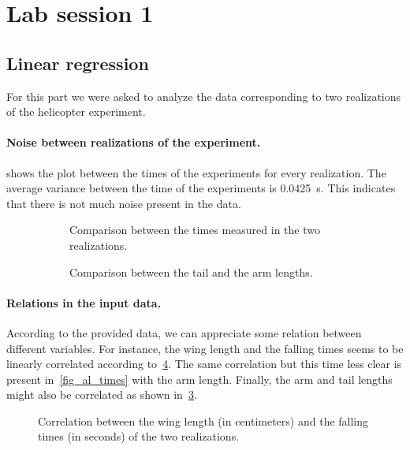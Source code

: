 \section{Lab session 1}

\subsection{Linear regression}
For this part we were asked to analyze the data corresponding to two
realizations of the helicopter experiment.

\paragraph{Noise between realizations of the experiment.}

 shows the plot between the times of the experiments for every
realization. The average variance between the time of the experiments is
\SI{0.0425}{\second}. This indicates that there is not much noise present in the
data.

\begin{figure}
  \begin{subfigure}[h]{.5\linewidth}
    
    \caption{Comparison between the times measured in the two realizations.}
    \label{fig_t1t2}
  \end{subfigure}
  \begin{subfigure}[h]{.5\linewidth}
    
    \caption{Comparison between the tail and the arm lengths.}
    \label{fig_tl_al}
  \end{subfigure}
  \caption{}
\end{figure}

\paragraph{Relations in the input data.}
According to the provided data, we can appreciate some relation between
different variables. For instance, the wing length and the falling times seems
to be linearly correlated according to~\cref{fig_wl_times}. The same correlation
but this time less clear is present in~\cref{fig_al_times} with the arm length.
Finally, the arm and tail lengths might also be correlated as shown
in~\cref{fig_tl_al}.
\begin{figure}
  \centering
  
  \caption{Correlation between the wing length (in centimeters) and the falling
  times (in seconds) of the two realizations.}
  \label{fig_wl_times}
\end{figure}

